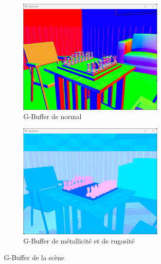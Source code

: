 \begin{figure}[H]
        \begin{subfigure}{0.5\textwidth}
            \centering
            \includegraphics[width=0.8\textwidth]{images/raptiquax_rendering_gbuffer_normal.png}
            \caption{G-Buffer de normal}
            \label{fig:graphics_pipeline_gbuffer_normal}
        \end{subfigure}
        \begin{subfigure}{0.5\textwidth}
            \centering
            \includegraphics[width=0.8\textwidth]{images/raptiquax_rendering_gbuffer_extra.png}
            \caption{G-Buffer de métallicité et de rugosité}
            \label{fig:graphics_pipeline_gbuffer_color}
        \end{subfigure}
        \caption{G-Buffer de la scène}
        \label{fig:graphics_pipeline_gbuffer}
    \end{figure}
